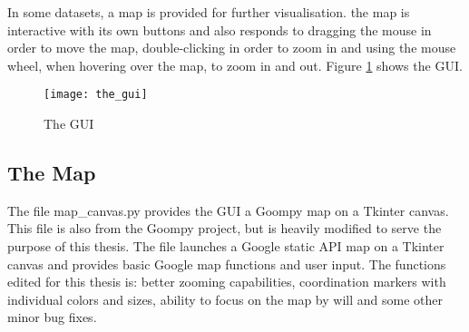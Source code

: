 In some datasets, a map is provided for further visualisation. the map is interactive with its own buttons and also responds to dragging the mouse in order to move the map, double-clicking in order to zoom in and using the mouse wheel, when hovering over the map, to zoom in and out. Figure \ref{fig:the_gui} shows the GUI.

\begin{figure}[!htb]
\texttt{[image: the\_gui]}
\centering
\caption{The GUI}
\label{fig:the_gui}
\end{figure}



\subsection{The Map}
The file map\_canvas.py provides the GUI a Goompy\cite{goompy} map on a Tkinter canvas. This file is also from the Goompy project, but is heavily modified to serve the purpose of this thesis. The file launches a Google static API map on a Tkinter canvas and provides basic Google map functions and user input. The functions edited for this thesis is: better zooming capabilities, coordination markers with individual colors and sizes, ability to focus on the map by will and some other minor bug fixes.

